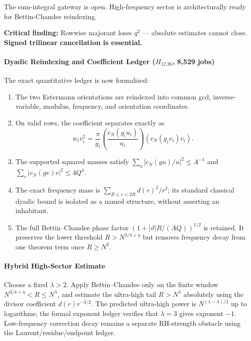 \documentclass[11pt,a4paper]{article}
\theoremstyle{plain}
\theoremstyle{definition}
\theoremstyle{remark}
\begin{document}
The sum-integral gateway is open. High-frequency sector is architecturally ready for Bettin-Chandee reindexing.

\textbf{Critical finding:} Rowwise majorant loses $q^2$ — absolute estimates cannot close. \textbf{Signed trilinear cancellation is essential.}

\paragraph{Dyadic Reindexing and Coefficient Ledger ($H_{12.26}$, 8,529 jobs)}

The exact quantitative ledger is now formalized:
\begin{enumerate}[label=(\roman*)]
  \item The two Estermann orientations are reindexed into common gcd, inverse-variable, modulus, frequency, and orientation coordinates.
  \item On valid rows, the coefficient separates exactly as
  \[
    w_i v_i^2=\frac{\pi}{g_i}
      \left(\frac{c_N(g_i u_i)}{u_i}\right)
      \left(c_N(g_i v_i)v_i\right).
  \]
  \item The supported squared masses satisfy
  $\sum_u|c_N(gu)/u|^2\le A^{-1}$ and
  $\sum_v|c_N(gv)v|^2\le4Q^3$.
  \item The exact frequency mass is
  $\sum_{R\le r<2R}d(r)^2/r^3$; its standard classical dyadic bound is isolated as a named structure, without asserting an inhabitant.
  \item The full Bettin--Chandee phase factor
  $(1+|\vartheta|R/(AQ))^{1/2}$ is retained. It preserves the lower threshold $R>N^{3/4+\eta}$ but removes frequency decay from one theorem term once $R\ge N^2$.
\end{enumerate}

\paragraph{Hybrid High-Sector Estimate}

Choose a fixed $\lambda>2$. Apply Bettin--Chandee only on the finite window
$N^{3/4+\eta}<R\le N^\lambda$, and estimate the ultra-high tail
$R>N^\lambda$ absolutely using the divisor coefficient $d(r)r^{-3/2}$.
The predicted ultra-high power is $N^{(1-\lambda)/2}$ up to logarithms; the
formal exponent ledger verifies that $\lambda=3$ gives exponent $-1$.
Low-frequency correction decay remains a separate RH-strength
obstacle using the Laurent/residue/endpoint ledger.
\end{document}
